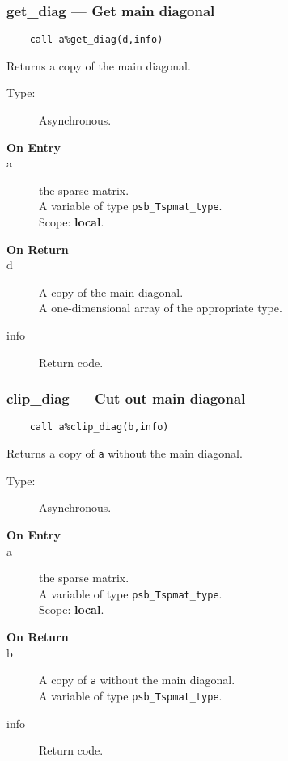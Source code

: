 \subsubsection*{get\_diag --- Get main diagonal}
\begin{verbatim}
    call a%get_diag(d,info)
\end{verbatim}

Returns a copy of  the main diagonal.
\begin{description}
\item[Type:] Asynchronous.
\item[\bf On Entry]
\item[a] the sparse matrix.\\
A variable of type \verb|psb_Tspmat_type|.\\
Scope: {\bf local}.\\
\end{description}
\begin{description}
\item[\bf On Return]
\item[d] A copy  of the main diagonal.\\
A one-dimensional array of the appropriate type.
\item[info] Return code. 
\end{description}


\subsubsection*{clip\_diag --- Cut out main diagonal}
\begin{verbatim}
    call a%clip_diag(b,info)
\end{verbatim}

Returns a copy of \verb|a| without the main diagonal.
\begin{description}
\item[Type:] Asynchronous.
\item[\bf On Entry]
\item[a] the sparse matrix.\\
A variable of type \verb|psb_Tspmat_type|.\\
Scope: {\bf local}.\\
\end{description}
\begin{description}
\item[\bf On Return]
\item[b] A copy  of  \verb|a| without the main diagonal.\\
A variable of type \verb|psb_Tspmat_type|.
\item[info] Return code. 
\end{description}



